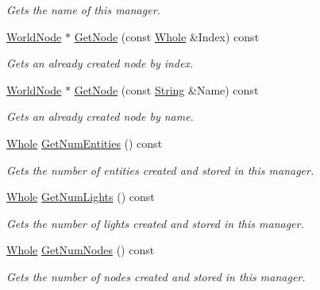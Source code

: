 \begin{DoxyCompactItemize}
\begin{DoxyCompactList}\small\item\em Gets the name of this manager. \item\end{DoxyCompactList}\item 
\hyperlink{classMezzanine_1_1WorldNode}{WorldNode} $\ast$ \hyperlink{classMezzanine_1_1SceneManager_a8bc6cd34431d1059d3e30fa20ec3c94f}{GetNode} (const \hyperlink{namespaceMezzanine_adcbb6ce6d1eb4379d109e51171e2e493}{Whole} \&Index) const 
\begin{DoxyCompactList}\small\item\em Gets an already created node by index. \item\end{DoxyCompactList}\item 
\hyperlink{classMezzanine_1_1WorldNode}{WorldNode} $\ast$ \hyperlink{classMezzanine_1_1SceneManager_a35fb2ab086d5cce5c7554d27e4d5a800}{GetNode} (const \hyperlink{namespaceMezzanine_acf9fcc130e6ebf08e3d8491aebcf1c86}{String} \&Name) const 
\begin{DoxyCompactList}\small\item\em Gets an already created node by name. \item\end{DoxyCompactList}\item 
\hyperlink{namespaceMezzanine_adcbb6ce6d1eb4379d109e51171e2e493}{Whole} \hyperlink{classMezzanine_1_1SceneManager_a409f664d4383b33700cba40f7ab99bbb}{GetNumEntities} () const 
\begin{DoxyCompactList}\small\item\em Gets the number of entities created and stored in this manager. \item\end{DoxyCompactList}\item 
\hyperlink{namespaceMezzanine_adcbb6ce6d1eb4379d109e51171e2e493}{Whole} \hyperlink{classMezzanine_1_1SceneManager_aa1cafdcd750fda2452db42cb3ddf365c}{GetNumLights} () const 
\begin{DoxyCompactList}\small\item\em Gets the number of lights created and stored in this manager. \item\end{DoxyCompactList}\item 
\hyperlink{namespaceMezzanine_adcbb6ce6d1eb4379d109e51171e2e493}{Whole} \hyperlink{classMezzanine_1_1SceneManager_ae78bda0af2b0f11f32d283d5cf83086f}{GetNumNodes} () const 
\begin{DoxyCompactList}\small\item\em Gets the number of nodes created and stored in this manager. \item\end{DoxyCompactList}\item 

\end{DoxyCompactItemize}

